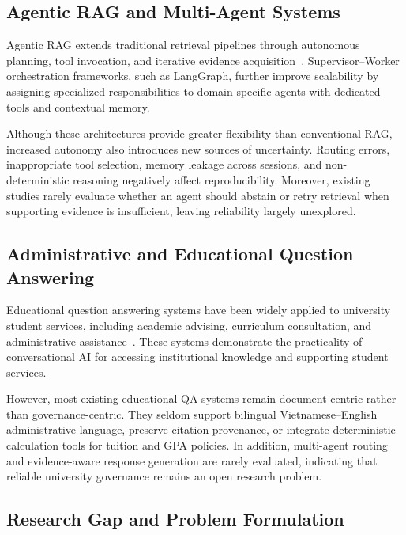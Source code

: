 \subsection{Agentic RAG and Multi-Agent Systems}

Agentic RAG extends traditional retrieval pipelines through autonomous planning, tool invocation, and iterative evidence acquisition~\cite{yao2023react}. Supervisor--Worker orchestration frameworks, such as LangGraph, further improve scalability by assigning specialized responsibilities to domain-specific agents with dedicated tools and contextual memory.

Although these architectures provide greater flexibility than conventional RAG, increased autonomy also introduces new sources of uncertainty. Routing errors, inappropriate tool selection, memory leakage across sessions, and non-deterministic reasoning negatively affect reproducibility. Moreover, existing studies rarely evaluate whether an agent should abstain or retry retrieval when supporting evidence is insufficient, leaving reliability largely unexplored.

\subsection{Administrative and Educational Question Answering}

Educational question answering systems have been widely applied to university student services, including academic advising, curriculum consultation, and administrative assistance~\cite{ma2025rebot}. These systems demonstrate the practicality of conversational AI for accessing institutional knowledge and supporting student services.

However, most existing educational QA systems remain document-centric rather than governance-centric. They seldom support bilingual Vietnamese--English administrative language, preserve citation provenance, or integrate deterministic calculation tools for tuition and GPA policies. In addition, multi-agent routing and evidence-aware response generation are rarely evaluated, indicating that reliable university governance remains an open research problem.

\subsection{Research Gap and Problem Formulation}
\label{sec:prob}

